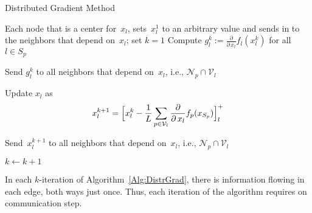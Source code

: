 \documentclass[letter,10pt]{article}
\theoremstyle{definition}
\theoremstyle{nonumberplain}
\begin{document}
	\begin{algorithm}
			\caption{Distributed Gradient Method}
			\algrenewcommand{}
			\label{Alg:DistrGrad}
    \begin{algorithmic}[1]
    \small
    \Require Each node that is a center for~$x_l$, sets~$x_l^1$ to an arbitrary value and sends in to the neighbors that depend on~$x_l$; set $k=1$
    \Repeat
				\State Compute $g_l^k :=\frac{\partial}{\partial\, x_l} f_l(x_l^k)$ for all~$l \in S_p$

				\State Send $g_l^k$ to all neighbors that depend on~$x_l$, i.e., $\mathcal{N}_p \cap \mathcal{V}_l$
      \EndFor

				\State Update $x_l$ as
					$$
						x_l^{k+1} = \Bigl[ x_l^k - \frac{1}{L} \sum_{p \in \mathcal{V}_l}\frac{\partial}{\partial\, x_l} f_p(x_{S_p})\Bigr]^+_l
					$$

				\State Send~$x_l^{k+1}$ to all neighbors that depend on~$x_l$, i.e., $\mathcal{N}_p \cap \mathcal{V}_l$
      \EndFor

      \State $k \gets k+1$

    \end{algorithmic}
  \end{algorithm}

  In each $k$-iteration of Algorithm~\ref{Alg:DistrGrad}, there is information flowing in each edge, both ways just once. Thus, each iteration of the algorithm requires on communication step.
\end{document}
